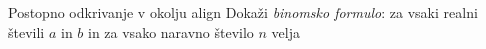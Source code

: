 \begin{frame}{Postopno odkrivanje v okolju align}
	Dokaži \emph{binomsko formulo}: za vsaki realni števili \(a\) in \(b\) in za vsako naravno število \(n\) velja
\end{frame}
